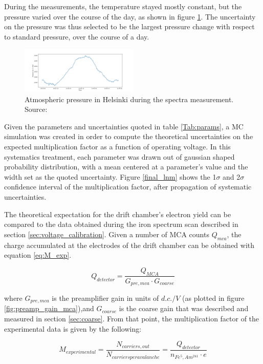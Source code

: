 During the measurements, the temperature stayed mostly constant, but the pressure varied over the course of the day, as shown in figure \ref{fig:pressure}. The uncertainty on the pressure was thus selected to be the largest pressure change with respect to standard pressure, over the course of a day.

\begin{figure}[htb]
  \includegraphics[width=0.5\textwidth]{graphics/pressure_monitoring.png}
  \caption{Atmospheric pressure in Helsinki during the spectra measurement. Source: \cite{meteo}}
  \label{fig:pressure}
\end{figure}

Given the parameters and uncertainties quoted in table \ref{Tab:params}, a MC simulation was created in order to compute the theoretical uncertainties on the expected multiplication factor as a function of operating voltage. In this systematics treatment, each parameter was drawn out of gaussian shaped probability distribution, with a mean centered at a parameter's value and the width set as the quoted uncertainty. Figure \ref{final_lnm} shows the 1$\sigma$ and 2$\sigma$ confidence interval of the multiplication factor, after propagation of systematic uncertainties.

The theoretical expectation for the drift chamber's electron yield can be compared to the data obtained during the iron spectrum scan described in section \ref{sec:voltage_calibration}. Given a number of MCA counts $Q_{mca}$, the charge accumulated at the electrodes of the drift chamber can be obtained with equation \ref{eq:M_exp}.

\begin{equation}
  \label{eq:M_exp}
  Q_{detector} = \frac{Q_{MCA}}{G_{pre,mca}\cdot{G_{coarse}}}
\end{equation}

where $G_{pre,mca}$ is the preamplifier gain in units of $d.c./V$ (as plotted in figure \ref{fig:preamp_gain_mca}),and $G_{coarse}$ is the coarse gain that was described and measured in section \ref{sec:coarse}. From that point, the multiplication factor of the experimental data is given by the following:

\begin{equation}
  M_{experimental} = \frac{N_{carriers,out}}{N_{carriers per avalanche}} = \frac{Q_{detector}}{n_{Fe^{5},Am^{241}}\cdot e}
\end{equation}

